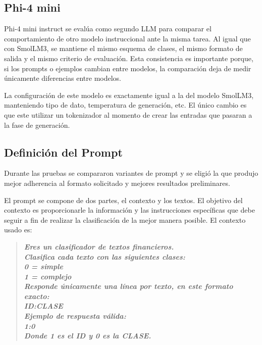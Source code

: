 \documentclass[12pt]{article}
\begin{document}
\subsection{Phi-4 mini}

Phi-4 mini instruct se evalúa como segundo LLM para comparar el comportamiento de otro modelo instruccional ante la misma tarea. Al igual que con SmolLM3, se mantiene el mismo esquema de clases, el mismo formato de salida y el mismo criterio de evaluación. Esta consistencia es importante porque, si los prompts o ejemplos cambian entre modelos, la comparación deja de medir únicamente diferencias entre modelos.

La configuración de este modelo es exactamente igual a la del modelo SmolLM3, manteniendo tipo de dato, temperatura de generación, etc. El único cambio es que este utilizar un tokenizador al momento de crear las entradas que pasaran a la fase de generación.

\subsection{Definición del Prompt}
Durante las pruebas se compararon variantes de prompt y se eligió la que produjo mejor adherencia al formato solicitado y mejores resultados preliminares.

El prompt se compone de dos partes, el contexto y los textos. El objetivo del contexto es proporcionarle la información y las instrucciones específicas que debe seguir a fin de realizar la clasificación de la mejor manera posible. El contexto usado es:

\begin{quotation}
\textbf{\textit{Eres un clasificador de textos financieros.}} \\

\textbf{\textit{Clasifica cada texto con las siguientes clases:}} \\

\textbf{\textit{0 = simple}} \\

\textbf{\textit{1 = complejo}} \\

\textbf{\textit{Responde únicamente una línea por texto, en este formato exacto:}} \\

\textbf{\textit{ID:CLASE}} \\

\textbf{\textit{Ejemplo de respuesta válida:}}\\

\textbf{\textit{1:0}}\\

\textbf{\textit{Donde 1 es el ID y 0 es la CLASE.}}
\end{quotation}
\end{document}
